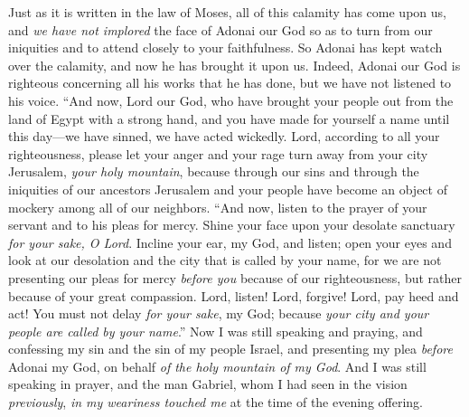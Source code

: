 \begin{biblechapter}
\verse Just as it is written in the law of Moses, all of this calamity has come upon us, and \textit{we have not implored} the face of Adonai our God so as to turn from our iniquities and to attend closely to your faithfulness.
\verse So Adonai has kept watch over the calamity, and now he has brought it upon us. Indeed, Adonai our God is righteous concerning all his works that he has done, but we have not listened to his voice.
\verse “And now, Lord our God, who have brought your people out from the land of Egypt with a strong hand, and you have made for yourself a name until this day—we have sinned, we have acted wickedly.
\verse Lord, according to all your righteousness, please let your anger and your rage turn away from your city Jerusalem, \textit{your holy mountain}, because through our sins and through the iniquities of our ancestors Jerusalem and your people have become an object of mockery among all of our neighbors.
\verse “And now, listen to the prayer of your servant and to his pleas for mercy. Shine your face upon your desolate sanctuary \textit{for your sake, O Lord}.
\verse Incline your ear, my God, and listen; open your eyes and look at our desolation and the city that is called by your name, for we are not presenting our pleas for mercy \textit{before you} because of our righteousness, but rather because of your great compassion.
\verse Lord, listen! Lord, forgive! Lord, pay heed and act! You must not delay \textit{for your sake}, my God; because \textit{your city and your people are called by your name}.”
 Now I was still speaking and praying, and confessing my sin and the sin of my people Israel, and presenting my plea \textit{before} Adonai my God, on behalf \textit{of the holy mountain of my God}.
\verse And I was still speaking in prayer, and the man Gabriel, whom I had seen in the vision \textit{previously}, \textit{in my weariness touched me} at the time of the evening offering.

\end{biblechapter}
